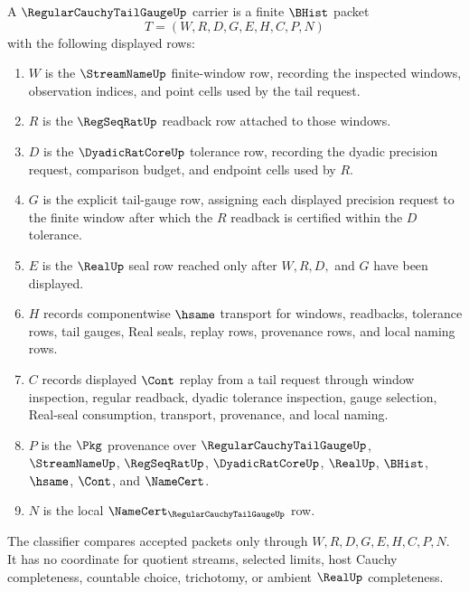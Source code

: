 \begin{definition}
\label{def:regular-cauchy-tail-gauge-carrier}
A $\RegularCauchyTailGaugeUp$ carrier is a finite $\BHist$ packet
$$
T=(W,R,D,G,E,H,C,P,N)
$$
with the following displayed rows:
\begin{enumerate}
\item $W$ is the $\StreamNameUp$ finite-window row, recording the inspected windows, observation indices, and point cells used by the tail request.
\item $R$ is the $\RegSeqRatUp$ readback row attached to those windows.
\item $D$ is the $\DyadicRatCoreUp$ tolerance row, recording the dyadic precision request, comparison budget, and endpoint cells used by $R$.
\item $G$ is the explicit tail-gauge row, assigning each displayed precision request to the finite window after which the $R$ readback is certified within the $D$ tolerance.
\item $E$ is the $\RealUp$ seal row reached only after $W,R,D,$ and $G$ have been displayed.
\item $H$ records componentwise $\hsame$ transport for windows, readbacks, tolerance rows, tail gauges, Real seals, replay rows, provenance rows, and local naming rows.
\item $C$ records displayed $\Cont$ replay from a tail request through window inspection, regular readback, dyadic tolerance inspection, gauge selection, Real-seal consumption, transport, provenance, and local naming.
\item $P$ is the $\Pkg$ provenance over $\RegularCauchyTailGaugeUp$, $\StreamNameUp$, $\RegSeqRatUp$, $\DyadicRatCoreUp$, $\RealUp$, $\BHist$, $\hsame$, $\Cont$, and $\NameCert$.
\item $N$ is the local $\NameCert_{\RegularCauchyTailGaugeUp}$ row.
\end{enumerate}
The classifier compares accepted packets only through $W,R,D,G,E,H,C,P,N$. It has no coordinate for quotient streams, selected limits, host Cauchy completeness, countable choice, trichotomy, or ambient $\RealUp$ completeness.
\end{definition}

